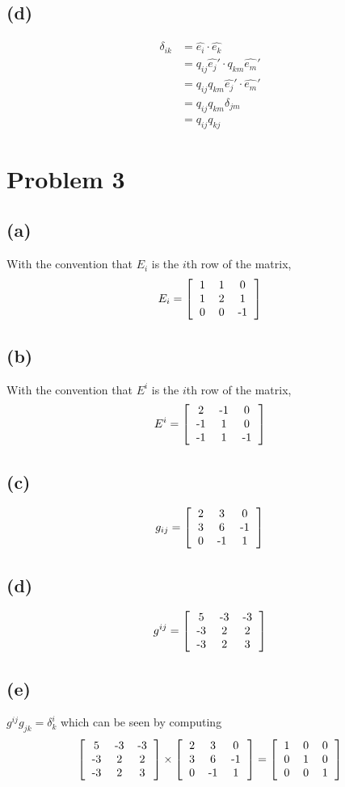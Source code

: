 \documentclass[12pt]{article}
\newcommand{\eq}[1]{\begin{align*}#1\end{align*}}
\newcommand{\mat}[2]{\ensuremath{\left[\begin{tabular}{#1}#2\end{tabular}\right]}}
\begin{document}
\subsection*{(d)}
\eq{
	\delta_{ik} &= \hat{e_i} \cdot \hat{e_k}\\
	&= q_{ij}\hat{e_j}' \cdot q_{km} \hat{e_m}'\\
	&= q_{ij}q_{km} \hat{e_j}' \cdot \hat{e_m}'\\
	&= q_{ij}q_{km} \delta_{jm}\\
	&= q_{ij}q_{kj}
}
\section*{Problem 3}
\subsection*{(a)} With the convention that $E_i$ is the $i$th row of the matrix,
\eq{
	E_i = \mat{ccc}{
		1 & 1 & 0\\
		1 & 2 & 1\\
		0 & 0 & -1\\
	}
}
\subsection*{(b)} With the convention that $E^i$ is the $i$th row of the matrix,
\eq{
	E^i = \mat{ccc}{
		2 & -1 & 0\\
		-1 & 1 & 0\\
		-1 & 1 & -1\\
	}
}
\subsection*{(c)}
\eq{
	g_{ij} = \mat{ccc}{
		2 & 3 & 0 \\
		3 & 6 & -1 \\
		0 & -1 & 1 \\
	}
}
\subsection*{(d)}
\eq{
	g^{ij} = \mat{ccc}{
		5 & -3 & -3 \\
		-3 & 2 & 2 \\
		-3 & 2 & 3 \\
	}
}
\subsection*{(e)} $g^{ij}g_{jk} = \delta^i_k$ which can be seen by computing
\eq{
\mat{ccc}{
		5 & -3 & -3 \\
		-3 & 2 & 2 \\
		-3 & 2 & 3 \\
	} \times
\mat{ccc}{
		2 & 3 & 0 \\
		3 & 6 & -1 \\
		0 & -1 & 1 \\
	} = 
\mat{ccc}{
	1 & 0 & 0 \\
	0 & 1 & 0 \\
	0 & 0 & 1 \\
}
}
\end{document}

